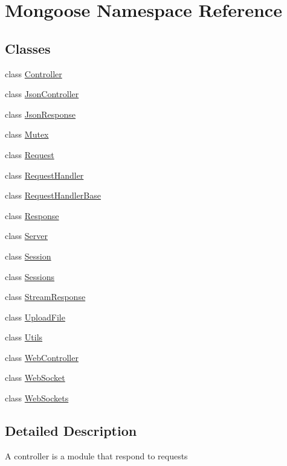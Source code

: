 \hypertarget{namespaceMongoose}{}\section{Mongoose Namespace Reference}
\label{namespaceMongoose}
\subsection*{Classes}
\begin{DoxyCompactItemize}
\item 
class \hyperlink{classMongoose_1_1Controller}{Controller}
\item 
class \hyperlink{classMongoose_1_1JsonController}{Json\+Controller}
\item 
class \hyperlink{classMongoose_1_1JsonResponse}{Json\+Response}
\item 
class \hyperlink{classMongoose_1_1Mutex}{Mutex}
\item 
class \hyperlink{classMongoose_1_1Request}{Request}
\item 
class \hyperlink{classMongoose_1_1RequestHandler}{Request\+Handler}
\item 
class \hyperlink{classMongoose_1_1RequestHandlerBase}{Request\+Handler\+Base}
\item 
class \hyperlink{classMongoose_1_1Response}{Response}
\item 
class \hyperlink{classMongoose_1_1Server}{Server}
\item 
class \hyperlink{classMongoose_1_1Session}{Session}
\item 
class \hyperlink{classMongoose_1_1Sessions}{Sessions}
\item 
class \hyperlink{classMongoose_1_1StreamResponse}{Stream\+Response}
\item 
class \hyperlink{classMongoose_1_1UploadFile}{Upload\+File}
\item 
class \hyperlink{classMongoose_1_1Utils}{Utils}
\item 
class \hyperlink{classMongoose_1_1WebController}{Web\+Controller}
\item 
class \hyperlink{classMongoose_1_1WebSocket}{Web\+Socket}
\item 
class \hyperlink{classMongoose_1_1WebSockets}{Web\+Sockets}
\end{DoxyCompactItemize}


\subsection{Detailed Description}
A controller is a module that respond to requests

